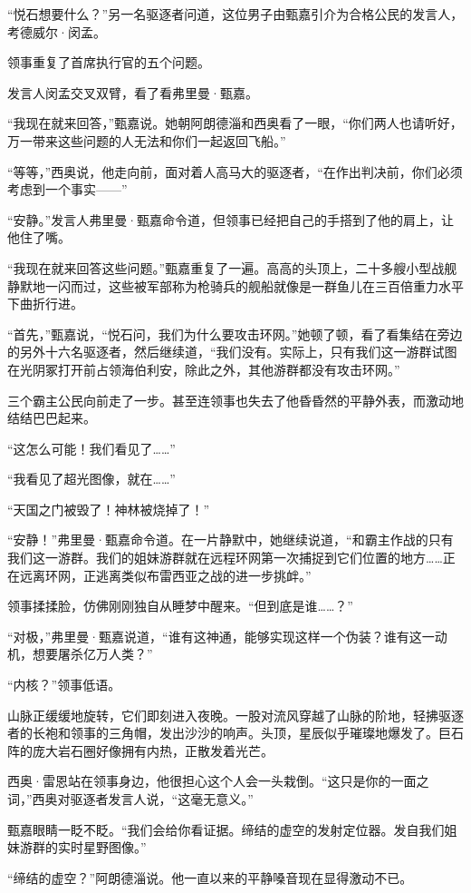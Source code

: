 \documentclass[AutoFakeBold=true]{book}
\begin{document}
``悦石想要什么？''另一名驱逐者问道，这位男子由甄嘉引介为合格公民的发言人，考德威尔·闵孟。

领事重复了首席执行官的五个问题。

发言人闵孟交叉双臂，看了看弗里曼·甄嘉。

``我现在就来回答，''甄嘉说。她朝阿朗德淄和西奥看了一眼，``你们两人也请听好，万一带来这些问题的人无法和你们一起返回飞船。''

``等等，''西奥说，他走向前，面对着人高马大的驱逐者，``在作出判决前，你们必须考虑到一个事实——''

``安静。''发言人弗里曼·甄嘉命令道，但领事已经把自己的手搭到了他的肩上，让他住了嘴。

``我现在就来回答这些问题。''甄嘉重复了一遍。高高的头顶上，二十多艘小型战舰静默地一闪而过，这些被军部称为枪骑兵的舰船就像是一群鱼儿在三百倍重力水平下曲折行进。

``首先，''甄嘉说，``悦石问，我们为什么要攻击环网。''她顿了顿，看了看集结在旁边的另外十六名驱逐者，然后继续道，``我们没有。实际上，只有我们这一游群试图在光阴冢打开前占领海伯利安，除此之外，其他游群都没有攻击环网。''

三个霸主公民向前走了一步。甚至连领事也失去了他昏昏然的平静外表，而激动地结结巴巴起来。

``这怎么可能！我们看见了……''

``我看见了超光图像，就在……''

``天国之门被毁了！神林被烧掉了！''

``安静！''弗里曼·甄嘉命令道。在一片静默中，她继续说道，``和霸主作战的只有我们这一游群。我们的姐妹游群就在远程环网第一次捕捉到它们位置的地方……正在远离环网，正逃离类似布雷西亚之战的进一步挑衅。''

领事揉揉脸，仿佛刚刚独自从睡梦中醒来。``但到底是谁……？''

``对极，''弗里曼·甄嘉说道，``谁有这神通，能够实现这样一个伪装？谁有这一动机，想要屠杀亿万人类？''

``内核？''领事低语。

山脉正缓缓地旋转，它们即刻进入夜晚。一股对流风穿越了山脉的阶地，轻拂驱逐者的长袍和领事的三角帽，发出沙沙的响声。头顶，星辰似乎璀璨地爆发了。巨石阵的庞大岩石圈好像拥有内热，正散发着光芒。

西奥·雷恩站在领事身边，他很担心这个人会一头栽倒。``这只是你的一面之词，''西奥对驱逐者发言人说，``这毫无意义。''

甄嘉眼睛一眨不眨。``我们会给你看证据。缔结的虚空的发射定位器。发自我们姐妹游群的实时星野图像。''

``缔结的虚空？''阿朗德淄说。他一直以来的平静嗓音现在显得激动不已。
\end{document}
